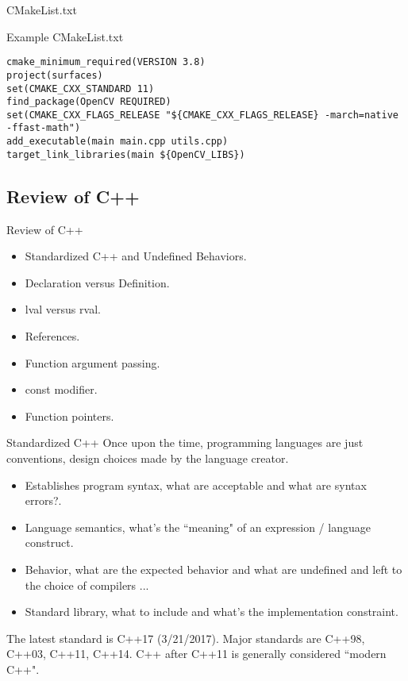 \begin{frame}[fragile]{CMakeList.txt}

Example CMakeList.txt

\begin{verbatim}
cmake_minimum_required(VERSION 3.8)
project(surfaces)
set(CMAKE_CXX_STANDARD 11)
find_package(OpenCV REQUIRED)
set(CMAKE_CXX_FLAGS_RELEASE "${CMAKE_CXX_FLAGS_RELEASE} -march=native -ffast-math")
add_executable(main main.cpp utils.cpp)
target_link_libraries(main ${OpenCV_LIBS})
\end{verbatim}

\end{frame}

\subsection{Review of C++}

\begin{frame}{Review of C++}

\begin{itemize}
	\item Standardized C++ and Undefined Behaviors.
	\item Declaration versus Definition.
	\item lval versus rval.
	\item References.
	\item Function argument passing.
	\item const modifier.
	\item Function pointers.
\end{itemize}

\end{frame}

\begin{frame}{Standardized C++}
Once upon the time, programming languages are just conventions, design choices made by the language creator. 

\begin{itemize}
	\item Establishes program syntax, what are acceptable and what are syntax errors?.
	\item Language semantics, what's the ``meaning" of an expression / language construct.
	\item Behavior, what are the expected behavior and what are undefined and left to the choice of compilers ...
	\item Standard library, what to include and what's the implementation constraint.
\end{itemize}
The latest standard is C++17 (3/21/2017). Major standards are C++98, C++03, C++11, C++14. C++ after C++11 is generally considered ``modern C++". 
\end{frame}

